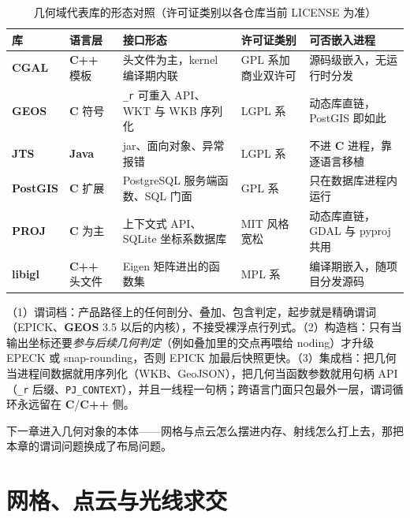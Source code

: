 \documentclass[12pt,a4paper,fontset=fandol]{ctexbook}
\newcommand{\Tp}[1]{\texttt{#1}}
\newcommand{\Bk}{\allowbreak}
\newcommand{\Lib}[1]{\textbf{#1}}
\newcommand{\Lang}[1]{\textsf{\bfseries #1}}
\newcommand{\CL}{\Lang{C}}
\newcommand{\CPP}{\Lang{C++}}
\begin{document}
\begin{table}[H]
\centering
\caption{几何域代表库的形态对照（许可证类别以各仓库当前 LICENSE 为准）}
\label{tab:ch08-libs}
\small
\begin{tabular}{@{}>{\raggedright\arraybackslash}p{}
  >{\raggedright\arraybackslash}p{}
  >{\raggedright\arraybackslash}p{}
  >{\raggedright\arraybackslash}p{}
  >{\raggedright\arraybackslash}p{}@{}}
\toprule
库 & 语言层 & 接口形态 & 许可证类别 & 可否嵌入进程 \\
\midrule
\Lib{CGAL} & \CPP{} 模板 & 头文件为主，kernel 编译期内联 &
  GPL 系加商业双许可 & 源码级嵌入，无运行时分发 \\
\Lib{GEOS} & \CL{} 符号 & \Tp{\_r} 可重入 API、WKT 与 WKB 序列化 &
  LGPL 系 & 动态库直链，PostGIS 即如此 \\
\Lib{JTS} & \Lang{Java} & jar、面向对象、异常报错 &
  LGPL 系 & 不进 \CL{} 进程，靠逐语言移植 \\
\Lib{PostGIS} & \CL{} 扩展 & PostgreSQL 服务端函数、SQL 门面 &
  GPL 系 & 只在数据库进程内运行 \\
\Lib{PROJ} & \CL{} 为主 & 上下文式 API、SQLite 坐标系数据库 &
  MIT 风格宽松 & 动态库直链，GDAL 与 pyproj 共用 \\
\Lib{libigl} & \CPP{} 头文件 & Eigen 矩阵进出的函数集 &
  MPL 系 & 编译期嵌入，随项目分发源码 \\
\bottomrule
\end{tabular}
\end{table}

\begin{bestpractice}[title={鲁棒性的三档投入}]
（1）谓词档：产品路径上的任何剖分、叠加、包含判定，起步就是精确谓词（EPICK、\Lib{GEOS} 3.5 以后的内核），不接受裸浮点行列式。（2）构造档：只有当输出坐标还要\emph{参与后续几何判定}（例如叠加里的交点再喂给 noding）才升级 EPECK 或 snap-rounding，否则 EPICK 加最后快照更快。（3）集成档：把几何当进程间数据就用序列化（WKB、GeoJSON），把几何当函数参数就用句柄 API（\Tp{\_r} 后缀、\Tp{PJ\_CONTEXT}），并且一线程一句柄；跨语言门面只包最外一层，谓词循环永远留在 \CL/{\Bk}\CPP{} 侧。
\end{bestpractice}

下一章进入几何对象的本体——网格与点云怎么摆进内存、射线怎么打上去，那把本章的谓词问题换成了布局问题。

\chapter{网格、点云与光线求交}
\end{document}
